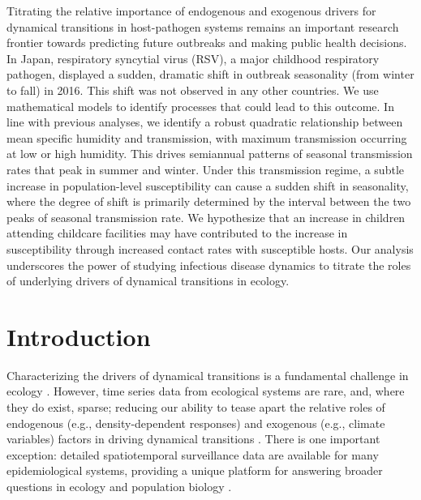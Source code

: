 \documentclass[12pt]{article}
\begin{document}
Titrating the relative importance of endogenous and exogenous drivers for dynamical transitions in host-pathogen systems remains an important research frontier towards predicting future outbreaks and making public health decisions.
In Japan, respiratory syncytial virus (RSV), a major childhood respiratory pathogen, displayed a sudden, dramatic shift in outbreak seasonality (from winter to fall) in 2016. 
This shift was not observed in any other countries.
We use mathematical models to identify processes that could lead to this outcome.
In line with previous analyses, we identify a robust quadratic relationship between mean specific humidity and transmission, with maximum transmission occurring at low or high humidity.
This drives semiannual patterns of seasonal transmission rates that peak in summer and winter.
Under this transmission regime, a subtle increase in population-level susceptibility can cause a sudden shift in seasonality, where the degree of shift is primarily determined by the interval between the two peaks of seasonal transmission rate.
We hypothesize that an increase in children attending childcare facilities may have contributed to the increase in susceptibility through increased contact rates with susceptible hosts.
Our analysis underscores the power of studying infectious disease dynamics to titrate the roles of underlying drivers of dynamical transitions in ecology.

\pagebreak

\section*{Introduction}

Characterizing the drivers of dynamical transitions is a fundamental challenge in ecology \citep{earn2000simple,hastings2004transients,hastings2018transient}.
However, time series data from ecological systems are rare, and, where they do exist, sparse; reducing our ability to tease apart the relative roles of endogenous (e.g., density-dependent responses) and exogenous (e.g., climate variables) factors in driving dynamical transitions \citep{hunter1998cycles,lundberg2000population,hernandez2012fluctuations}.
There is one important exception: detailed spatiotemporal surveillance data are available for many epidemiological systems, providing a unique platform for answering broader questions in ecology and population biology \citep{levin1997mathematical,anderson1991infectious,grenfell2001travelling,he2010plug}.
\end{document}
